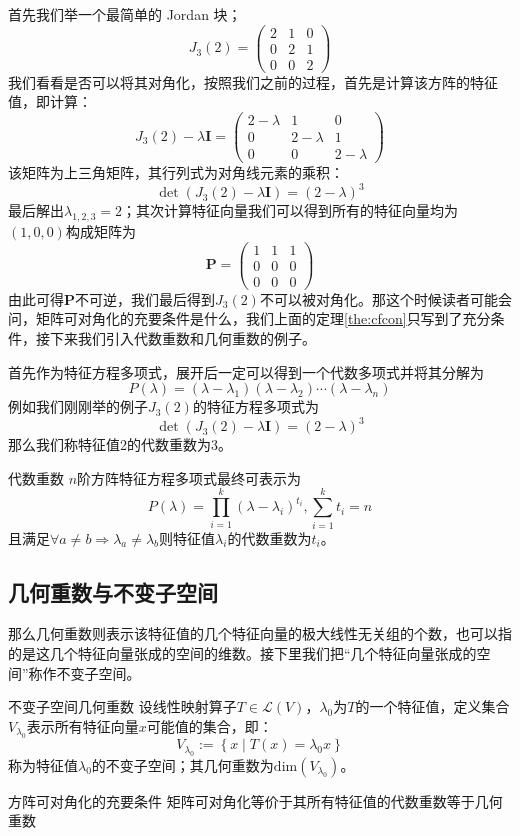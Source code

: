 首先我们举一个最简单的 Jordan 块；
$$
J_3(2)=\begin{pmatrix}
 2 & 1 & 0\\
 0 & 2 & 1\\
 0 & 0 & 2
\end{pmatrix}
$$
我们看看是否可以将其对角化，按照我们之前的过程，首先是计算该方阵的特征值，即计算：
$$
J_3(2) - \lambda \mathbf{I} = \begin{pmatrix} 2-\lambda & 1 & 0 \\ 0 & 2-\lambda & 1 \\ 0 & 0 & 2-\lambda \end{pmatrix}
$$
该矩阵为上三角矩阵，其行列式为对角线元素的乘积：$$\det(J_3(2) - \lambda \mathbf{I}) = (2-\lambda)^3$$最后解出$\lambda_{1,2,3}=2$；其次计算特征向量我们可以得到所有的特征向量均为$(1,0,0)$构成矩阵为$$\mathbf{P}=\begin{pmatrix}
 1 & 1 & 1\\
 0 & 0 & 0\\
 0 & 0 & 0
\end{pmatrix}$$由此可得$\mathbf{P}$不可逆，我们最后得到$J_3(2)$不可以被对角化。那这个时候读者可能会问，矩阵可对角化的充要条件是什么，我们上面的定理\ref{the:cfcon}只写到了充分条件，接下来我们引入代数重数和几何重数的例子。

首先作为特征方程多项式，展开后一定可以得到一个代数多项式并将其分解为
$$
P(\lambda) = (\lambda - \lambda_1)(\lambda - \lambda_2) \cdots (\lambda - \lambda_n)
$$
例如我们刚刚举的例子$J_3(2)$的特征方程多项式为$$\det(J_3(2) - \lambda \mathbf{I}) = (2-\lambda)^3$$那么我们称特征值2的代数重数为3。

\begin{definition}{代数重数}
	$n$阶方阵特征方程多项式最终可表示为$$P(\lambda)=\prod_{i=1}^{k} (\lambda-\lambda_i)^{t_i},\sum_{i=1}^{k}t_i=n$$且满足$\forall a\neq b\Longrightarrow\lambda_a\neq\lambda_b$则特征值$\lambda_i$的代数重数为$t_i$。
\end{definition}

\subsection{几何重数与不变子空间}

那么几何重数则表示该特征值的几个特征向量的极大线性无关组的个数，也可以指的是这几个特征向量张成的空间的维数。接下里我们把``几个特征向量张成的空间''称作不变子空间。

\begin{definition}{不变子空间几何重数}
	设线性映射算子$T\in \mathcal{L}(V)$，$\lambda_0$为$T$的一个特征值，定义集合$V_{\lambda_0}$表示所有特征向量$x$可能值的集合，即：$$V_{\lambda_0}:=\left\{ x\mid T(x)=\lambda_0 x \right\}$$称为特征值$\lambda_0$的不变子空间；其几何重数为$\text{dim}\left( V_{\lambda_0} \right)$。
\end{definition}

\begin{theorem}{方阵可对角化的充要条件}
	矩阵可对角化等价于其所有特征值的代数重数等于几何重数
\end{theorem}
